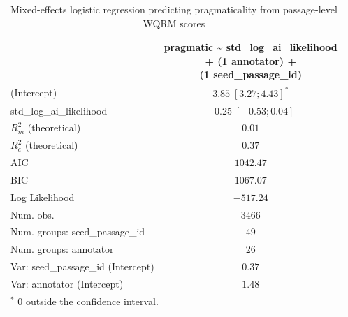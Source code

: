 
\usepackage{booktabs}

\begin{table}[htbp]
\begin{center}
\begin{tabular}{l c}
\toprule
 & \shortstack[l]{pragmatic \textasciitilde{} std\_log\_ai\_likelihood  \\ 
+ (1 \textbar{} annotator) + \\ 
(1 \textbar{} seed\_passage\_id)} \\
\midrule
(Intercept)                        & $3.85 \; [ 3.27; 4.43]^{*}$ \\
std\_log\_ai\_likelihood           & $-0.25 \; [-0.53; 0.04]$    \\
\midrule
$R^2_m$ (theoretical)              & $0.01$                      \\
$R^2_c$ (theoretical)              & $0.37$                      \\
AIC                                & $1042.47$                   \\
BIC                                & $1067.07$                   \\
Log Likelihood                     & $-517.24$                   \\
Num. obs.                          & $3466$                      \\
Num. groups: seed\_passage\_id     & $49$                        \\
Num. groups: annotator             & $26$                        \\
Var: seed\_passage\_id (Intercept) & $0.37$                      \\
Var: annotator (Intercept)         & $1.48$                      \\
\bottomrule
\multicolumn{2}{l}{\scriptsize{$^*$ 0 outside the confidence interval.}}
\end{tabular}
\caption{Mixed-effects logistic regression predicting pragmaticality from passage-level WQRM scores}
\label{tab:glmer_prag_ail}
\end{center}
\end{table}
